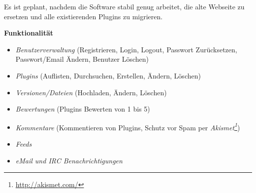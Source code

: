 \documentclass[pdftex,11pt,a4paper,notitlepage]{report}
\begin{document}
Es ist geplant,
nachdem die Software stabil genug arbeitet, die alte Webseite zu ersetzen und alle
existierenden Plugins zu migrieren.

\begin{flushleft}
\textbf{Funktionalität}
\end{flushleft}

\begin{itemize}
\item \textit{Benutzerverwaltung} (Registrieren, Login, Logout, Passwort Zurücksetzen, Passwort/Email Ändern, Benutzer Löschen)
\item \textit{Plugins} (Auflisten, Durchsuchen, Erstellen, Ändern, Löschen)
\item \textit{Versionen/Dateien} (Hochladen, Ändern, Löschen)
\item \textit{Bewertungen} (Plugins Bewerten von 1 bis 5)
\item \textit{Kommentare} (Kommentieren von Plugins, Schutz vor Spam per \textit{Akismet\footnote{\url{http://akismet.com/}}})
\item \textit{Feeds}
\item \textit{eMail und IRC Benachrichtigungen}
\end{itemize}
\end{document}
